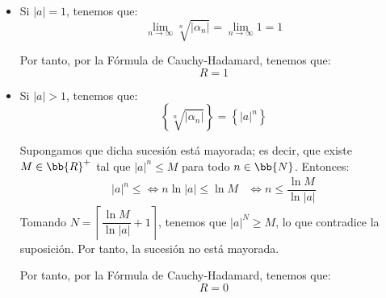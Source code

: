 \begin{ejercicio}
\begin{enumerate}
\begin{itemize}
            \item Si $|a|=1$, tenemos que:
            \begin{equation*}
                \lim_{n \to \infty} \sqrt[n]{|\alpha_n|} = \lim_{n \to \infty} 1 = 1
            \end{equation*}

            Por tanto, por la Fórmula de Cauchy-Hadamard, tenemos que:
            \begin{equation*}
                R = 1
            \end{equation*}

            \item Si $|a|>1$, tenemos que:
            \begin{equation*}
                \left\{\sqrt[n]{|\alpha_n|}\right\} = \left\{|a|^n\right\}
            \end{equation*}

            Supongamos que dicha sucesión está mayorada; es decir, que existe $M\in \bb{R}^+$ tal que $|a|^n\leq M$ para todo $n\in \bb{N}$. Entonces:
            \begin{align*}
                |a|^n \leq \iff n\ln|a|\leq \ln M &\iff n\leq \dfrac{\ln M}{\ln|a|}
            \end{align*}
            Tomando $N=\left\lceil\dfrac{\ln M}{\ln|a|}+1\right\rceil$, tenemos que $|a|^N\geq M$, lo que contradice la suposición. Por tanto, la sucesión no está mayorada.

            Por tanto, por la Fórmula de Cauchy-Hadamard, tenemos que:
            \begin{equation*}
                R = 0
            \end{equation*}
        \end{itemize}
    \end{enumerate}
\end{ejercicio}

